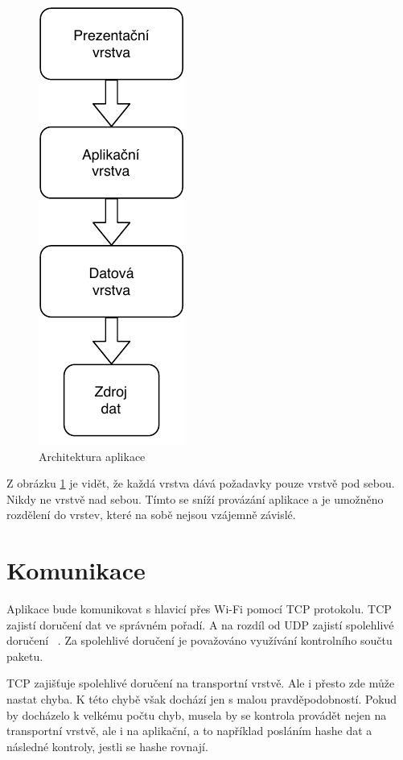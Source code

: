 \documentclass[thesis=B,czech]{FITthesis}[2012/10/20]
\begin{document}
\begin{figure}\centering
	\includegraphics{diagrams/Architektura}
	\caption[Architektura aplikace]{Architektura aplikace}\label{fig:architektura}
\end{figure}

Z obrázku \ref{fig:architektura} je vidět, že každá vrstva dává požadavky pouze vrstvě pod sebou. Nikdy ne vrstvě nad sebou. Tímto se sníží provázání aplikace a je umožněno rozdělení do vrstev, které na sobě nejsou vzájemně závislé.

\section{Komunikace}

Aplikace bude komunikovat s hlavicí přes Wi-Fi pomocí TCP protokolu. TCP zajistí doručení dat ve správném pořadí. A na rozdíl od UDP zajistí spolehlivé doručení ~\cite{tcp}. Za spolehlivé doručení je považováno využívání kontrolního součtu paketu. 

TCP zajišťuje spolehlivé doručení na transportní vrstvě. Ale i přesto zde může nastat chyba. K této chybě však dochází jen s malou pravděpodobností. Pokud by docházelo k velkému počtu chyb, musela by se kontrola provádět nejen na transportní vrstvě, ale i na aplikační, a to například posláním hashe dat a následné kontroly, jestli se hashe rovnají.
\end{document}
